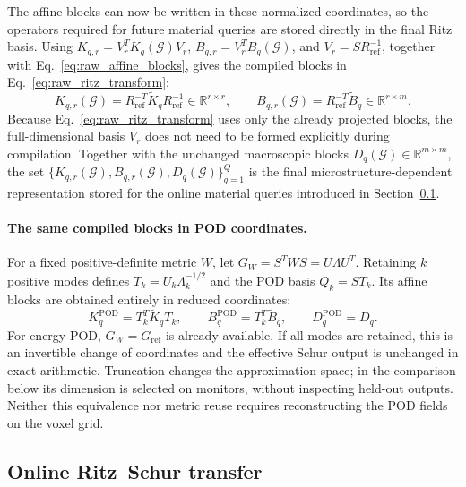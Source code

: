 \documentclass[pdflatex,sn-basic,Numbered]{sn-jnl}
\newcommand{\R}{\mathbb{R}}
\newcommand{\G}{\mathcal{G}}
\begin{document}
The affine blocks can now be written in these normalized coordinates, so the
operators required for future material queries are stored directly in the
final Ritz basis. Using
\(K_{q,r}=V_r^TK_q(\G)V_r\),
\(B_{q,r}=V_r^TB_q(\G)\), and
\(V_r=SR_{\mathrm{ref}}^{-1}\), together with
Eq.~\eqref{eq:raw_affine_blocks}, gives the compiled blocks in
Eq.~\eqref{eq:raw_ritz_transform}:
\begin{equation}
\label{eq:raw_ritz_transform}
K_{q,r}(\G)
=
R_{\mathrm{ref}}^{-T}
\widetilde K_q
R_{\mathrm{ref}}^{-1}
\in\R^{r\times r},
\qquad
B_{q,r}(\G)
=
R_{\mathrm{ref}}^{-T}
\widetilde B_q
\in\R^{r\times m}.
\end{equation}
Because Eq.~\eqref{eq:raw_ritz_transform} uses only the already projected
blocks, the full-dimensional basis \(V_r\) does not need to be formed
explicitly during compilation. Together with the unchanged macroscopic blocks
\(D_q(\G)\in\R^{m\times m}\), the set
\(\{K_{q,r}(\G),B_{q,r}(\G),D_q(\G)\}_{q=1}^{Q}\) is the final
microstructure-dependent representation stored for the online material
queries introduced in Section~\ref{subsec:reduced_transfer}.

\paragraph{The same compiled blocks in POD coordinates.}
For a fixed positive-definite metric \(W\), let
\(G_W=S^TWS=U\Lambda U^T\). Retaining \(k\) positive modes defines
\(T_k=U_k\Lambda_k^{-1/2}\) and the POD basis \(Q_k=ST_k\).
Its affine blocks are obtained entirely in reduced coordinates:
\begin{equation}
K_q^{\mathrm{POD}}=T_k^T\widetilde K_qT_k,\qquad
B_q^{\mathrm{POD}}=T_k^T\widetilde B_q,\qquad
D_q^{\mathrm{POD}}=D_q.
\label{eq:pod_block_transform}
\end{equation}
For energy POD, \(G_W=G_{\mathrm{ref}}\) is already available. If all modes
are retained, this is an invertible change of coordinates and the effective
Schur output is unchanged in exact arithmetic. Truncation changes the
approximation space; in the comparison below its dimension is selected on
monitors, without inspecting held-out outputs. Neither this equivalence nor
metric reuse requires reconstructing the POD fields on the voxel grid.

\subsection{Online Ritz--Schur transfer}
\label{subsec:reduced_transfer}
\end{document}
